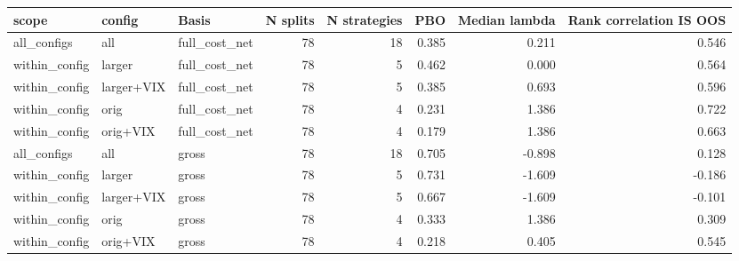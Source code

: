 \begin{tabular}{lllrrrrr}
\toprule
scope & config & Basis & N splits & N strategies & PBO & Median lambda & Rank correlation IS OOS \\
\midrule
all\_configs & all & full\_cost\_net & 78 & 18 & 0.385 & 0.211 & 0.546 \\
within\_config & larger & full\_cost\_net & 78 & 5 & 0.462 & 0.000 & 0.564 \\
within\_config & larger+VIX & full\_cost\_net & 78 & 5 & 0.385 & 0.693 & 0.596 \\
within\_config & orig & full\_cost\_net & 78 & 4 & 0.231 & 1.386 & 0.722 \\
within\_config & orig+VIX & full\_cost\_net & 78 & 4 & 0.179 & 1.386 & 0.663 \\
all\_configs & all & gross & 78 & 18 & 0.705 & -0.898 & 0.128 \\
within\_config & larger & gross & 78 & 5 & 0.731 & -1.609 & -0.186 \\
within\_config & larger+VIX & gross & 78 & 5 & 0.667 & -1.609 & -0.101 \\
within\_config & orig & gross & 78 & 4 & 0.333 & 1.386 & 0.309 \\
within\_config & orig+VIX & gross & 78 & 4 & 0.218 & 0.405 & 0.545 \\
\bottomrule
\end{tabular}
